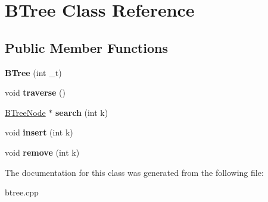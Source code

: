 \hypertarget{classBTree}{}\section{B\+Tree Class Reference}
\label{classBTree}
\subsection*{Public Member Functions}
\begin{DoxyCompactItemize}
\item 
{\bfseries B\+Tree} (int \+\_\+t)\hypertarget{classBTree_aac302f8a9556260da4c0b4403a6d7486}{}\label{classBTree_aac302f8a9556260da4c0b4403a6d7486}

\item 
void {\bfseries traverse} ()\hypertarget{classBTree_a448fc33abb56a5189c93e610455f1d98}{}\label{classBTree_a448fc33abb56a5189c93e610455f1d98}

\item 
\hyperlink{classBTreeNode}{B\+Tree\+Node} $\ast$ {\bfseries search} (int k)\hypertarget{classBTree_a2378e11e511e54690a761d46eccb1da4}{}\label{classBTree_a2378e11e511e54690a761d46eccb1da4}

\item 
void {\bfseries insert} (int k)\hypertarget{classBTree_a54d5d9826a6f855ff80e5239fe857af9}{}\label{classBTree_a54d5d9826a6f855ff80e5239fe857af9}

\item 
void {\bfseries remove} (int k)\hypertarget{classBTree_a3cfeb45e4590605285b78bb3538c81e8}{}\label{classBTree_a3cfeb45e4590605285b78bb3538c81e8}

\end{DoxyCompactItemize}


The documentation for this class was generated from the following file\+:\begin{DoxyCompactItemize}
\item 
btree.\+cpp\end{DoxyCompactItemize}
